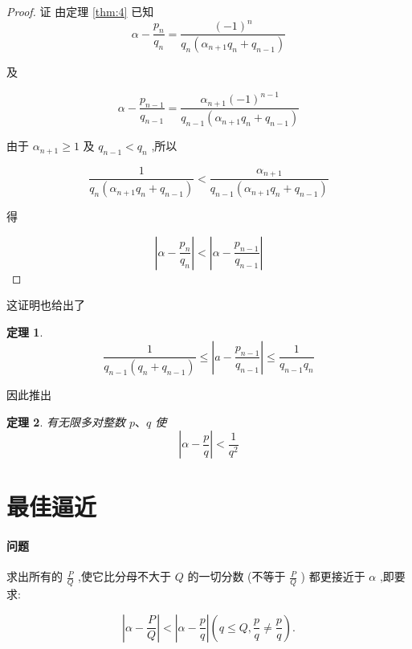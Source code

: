 \documentclass{ctexart}
\newtheorem{theorem}{\indent 定理}[section]
\begin{document}
\begin{proof}
  证 由定理 \ref{thm:4} 已知
\[
\alpha - \frac{{p}_{n}}{{q}_{n}} = \frac{{\left( -1\right) }^{n}}{{q}_{n}\left( {{\alpha }_{n + 1}{q}_{n} + {q}_{n - 1}}\right) }
\]

及

\[
\alpha - \frac{{p}_{n - 1}}{{q}_{n - 1}} = \frac{{\alpha }_{n + 1}{\left( -1\right) }^{n - 1}}{{q}_{n - 1}\left( {{\alpha }_{n + 1}{q}_{n} + {q}_{n - 1}}\right) }
\]

由于 \({\alpha }_{n + 1} \geq 1\) 及 \({q}_{n - 1} < {q}_{n}\) ,所以

\[
\frac{1}{{q}_{n}\left( {{\alpha }_{n + 1}{q}_{n} + {q}_{n - 1}}\right) } < \frac{{\alpha }_{n + 1}}{{q}_{n - 1}\left( {{\alpha }_{n + 1}{q}_{n} + {q}_{n - 1}}\right) }
\]

得

\[
\left| {\alpha - \frac{{p}_{n}}{{q}_{n}}}\right| < \left| {\alpha - \frac{{p}_{n - 1}}{{q}_{n - 1}}}\right|
\]

\end{proof}

这证明也给出了

\begin{theorem}
  \label{thm:6}
  \[\frac{1}{{q}_{n - 1}\left( {{q}_{n} + {q}_{n - 1}}\right) } \leq \left| {a - \frac{{p}_{n - 1}}{{q}_{n - 1}}}\right| \leq \frac{1}{{q}_{n - 1}{q}_{n}}\]
\end{theorem}

因此推出

\begin{theorem}
  \label{thm:7}
  有无限多对整数 \(p\text{、}q\) 使
\[
\left| {\alpha - \frac{p}{q}}\right| < \frac{1}{{q}^{2}}
\]
\end{theorem}


\section{最佳逼近}

\paragraph*{问题} 求出所有的 \(\frac{P}{Q}\) ,使它比分母不大于 \(Q\) 的一切分数 (不等于 \(\frac{P}{Q}\) ) 都更接近于 \(\alpha\) ,即要求:

\begin{equation}
\label{eq:6}
\left| {\alpha - \frac{P}{Q}}\right| < \left| {\alpha - \frac{p}{q}}\right| \left( {q \leq Q,\frac{p}{q} \neq \frac{p}{q}}\right) . \tag{1}
\end{equation}
\end{document}
